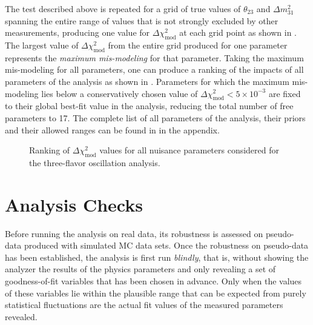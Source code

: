 The test described above is repeated for a grid of true values of $\theta_{23}$ and $\Delta m^2_{31}$ spanning the entire range of values that is not strongly excluded by other measurements, producing one value for $\Delta \chi^2_{\mathrm{mod}}$ at each grid point as shown in . The largest value of $\Delta \chi^2_{\mathrm{mod}}$ from the entire grid produced for one parameter represents the \emph{maximum mis-modeling} for that parameter. Taking the maximum mis-modeling for all parameters, one can produce a ranking of the impacts of all parameters of the analysis as shown in . Parameters for which the maximum mis-modeling lies below a conservatively chosen value of $\Delta \chi^2_{\mathrm{mod}} < 5\times10^{-3}$ are fixed to their global best-fit value in the analysis, reducing the total number of free parameters to 17. The complete list of all parameters of the analysis, their priors and their allowed ranges can be found in  in the appendix.
\begin{figure}
    \centering
    
    \caption{Ranking of $\Delta \chi^2_{\mathrm{mod}}$ values for all nuisance parameters considered for the three-flavor oscillation analysis.}
    \label{fig:systematic-impact-mismod-ranking}
\end{figure}

\section{Analysis Checks}
Before running the analysis on real data, its robustness is assessed on pseudo-data produced with simulated MC data sets. Once the robustness on pseudo-data has been established, the analysis is first run \emph{blindly}, that is, without showing the analyzer the results of the physics parameters and only revealing a set of goodness-of-fit variables that has been chosen in advance. Only when the values of these variables lie within the plausible range that can be expected from purely statistical fluctuations are the actual fit values of the measured parameters revealed. 

